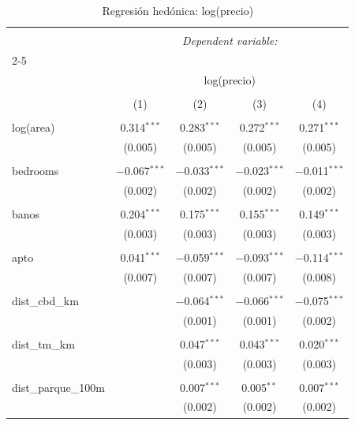 
\begin{table}[!htbp] \centering 
  \caption{Regresión hedónica: log(precio)} 
  \label{} 
\begin{tabular}{@{\extracolsep{5pt}}lcccc} 
\\[-1.8ex]\hline 
\hline \\[-1.8ex] 
 & \multicolumn{4}{c}{\textit{Dependent variable:}} \\ 
\cline{2-5} 
\\[-1.8ex] & \multicolumn{4}{c}{log(precio)} \\ 
\\[-1.8ex] & (1) & (2) & (3) & (4)\\ 
\hline \\[-1.8ex] 
 log(area) & 0.314$^{***}$ & 0.283$^{***}$ & 0.272$^{***}$ & 0.271$^{***}$ \\ 
  & (0.005) & (0.005) & (0.005) & (0.005) \\ 
  & & & & \\ 
 bedrooms & $-$0.067$^{***}$ & $-$0.033$^{***}$ & $-$0.023$^{***}$ & $-$0.011$^{***}$ \\ 
  & (0.002) & (0.002) & (0.002) & (0.002) \\ 
  & & & & \\ 
 banos & 0.204$^{***}$ & 0.175$^{***}$ & 0.155$^{***}$ & 0.149$^{***}$ \\ 
  & (0.003) & (0.003) & (0.003) & (0.003) \\ 
  & & & & \\ 
 apto & 0.041$^{***}$ & $-$0.059$^{***}$ & $-$0.093$^{***}$ & $-$0.114$^{***}$ \\ 
  & (0.007) & (0.007) & (0.007) & (0.008) \\ 
  & & & & \\ 
 dist\_cbd\_km &  & $-$0.064$^{***}$ & $-$0.066$^{***}$ & $-$0.075$^{***}$ \\ 
  &  & (0.001) & (0.001) & (0.002) \\ 
  & & & & \\ 
 dist\_tm\_km &  & 0.047$^{***}$ & 0.043$^{***}$ & 0.020$^{***}$ \\ 
  &  & (0.003) & (0.003) & (0.003) \\ 
  & & & & \\ 
 dist\_parque\_100m &  & 0.007$^{***}$ & 0.005$^{**}$ & 0.007$^{***}$ \\ 
  &  & (0.002) & (0.002) & (0.002) \\ 

\end{tabular}
\end{table}

